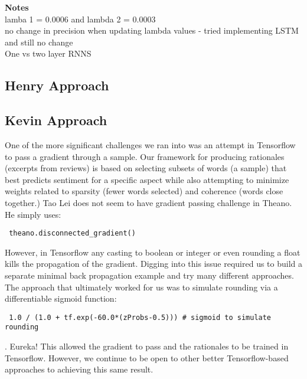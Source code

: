 \documentclass{article} %
\begin{document}
\textbf{Notes} \\

lamba 1 = 0.0006 and lambda 2 = 0.0003 \\

no change in precision when updating lambda values - tried implementing LSTM and still no change\\

One vs two layer RNNS \\

\subsection{Henry Approach}
\subsection{Kevin Approach}

One of the more significant challenges we ran into was an attempt in Tensorflow to pass a gradient through a sample.  Our framework for producing rationales (excerpts from reviews) is based on selecting subsets of words (a sample) that best predicts sentiment for a specific aspect while also attempting to minimize weights related to sparsity (fewer words selected) and coherence (words close together.)  Tao Lei does not seem to have gradient passing challenge in Theano.  He simply uses: \begin{verbatim} theano.disconnected_gradient() \end{verbatim}  However, in Tensorflow any casting to boolean or integer or even rounding a float kills the propagation of the gradient.  Digging into this issue required us to build a separate minimal back propagation example and try many different approaches.  The approach that ultimately worked for us was to simulate rounding via a differentiable sigmoid function: \begin{verbatim} 1.0 / (1.0 + tf.exp(-60.0*(zProbs-0.5))) # sigmoid to simulate rounding \end{verbatim}.  Eureka!  This allowed the gradient to pass and the rationales to be trained in Tensorflow.  However, we continue to be open to other better Tensorflow-based approaches to achieving this same result.

\end{document}

